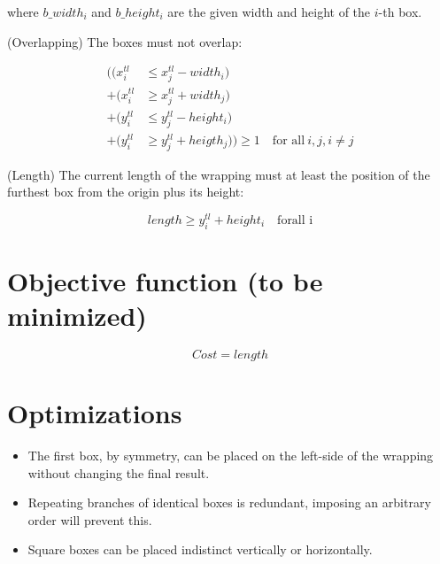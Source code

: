 \documentclass[12pt, a4paper]{article} %
\begin{document}
where $b\_width_i$ and $b\_height_i$ are the given width and height of the $i$-th box.

(Overlapping) The boxes must not overlap:

\begin{equation}\label{eq:three}
  \begin{split}
    ((x^{tl}_i &\leq x^{tl}_j - width_i)\\
    + (x^{tl}_i &\geq x^{tl}_j + width_j)\\
    + (y^{tl}_i &\leq y^{tl}_j - height_i)\\
    + (y^{tl}_i &\geq y^{tl}_j + heigth_j)) \geq 1 \quad \text{for all} \ i, j, i \neq j
  \end{split}
\end{equation}

(Length) The current length of the wrapping must at least the position of the furthest box from the origin plus its height:

\begin{equation}\label{eq:four}
  length \geq y^{tl}_i + height_i \quad \text{forall i}
\end{equation}



\section{Objective function (to be minimized)}\label{variables}

\begin{equation}\label{eq:four}
  Cost = length
\end{equation}



\section{Optimizations}\label{optimizations}

\begin{itemize}
  \item The first box, by symmetry, can be placed on the left-side of the wrapping without changing the final result.
  \item Repeating branches of identical boxes is redundant, imposing an arbitrary order will prevent this.
  \item Square boxes can be placed indistinct vertically or horizontally.
\end{itemize}

\end{document}
